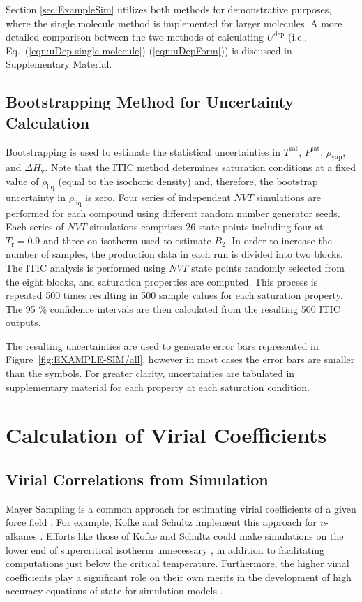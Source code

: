 \documentclass[5p,times]{elsarticle}
\begin{document}
Section \ref{sec:ExampleSim} utilizes both methods for demonstrative purposes, where the single molecule method is implemented for larger molecules. A more detailed comparison between the two methods of calculating $U^{\mathrm{dep}}$ (i.e., Eq.~(\ref{eqn:uDep single molecule})-(\ref{eqn:uDepForm})) is discussed in Supplementary Material.



\subsection{Bootstrapping Method for Uncertainty Calculation}\label{sec:bootstrapping}
Bootstrapping is used to estimate the statistical uncertainties \cite{Efron1981} in $T^\mathrm{sat}$, $P^\mathrm{sat}$, $\rho_\mathrm{vap}$, and $\Delta H_\mathrm{v}$. Note that the ITIC method determines saturation conditions at a fixed value of $\rho_{\mathrm{liq}}$ (equal to the isochoric density) and, therefore, the bootstrap uncertainty in $\rho_{\mathrm{liq}}$ is zero. Four series of independent $NVT$ simulations are performed for each compound using different random number generator seeds. Each series of $NVT$ simulations comprises 26 state points including four at $T_\mathrm{r}=0.9$ and three on isotherm used to estimate $B_2$. In order to increase the number of samples, the production data in each run is divided into two blocks. The ITIC analysis is performed using $NVT$ state points randomly selected from the eight blocks, and saturation properties are computed. This process is repeated 500 times resulting in 500 sample values for each saturation property. The 95 \% confidence intervals are then calculated from the resulting 500 ITIC outputs. 

The resulting uncertainties are used to generate error bars represented in Figure~\ref{fig:EXAMPLE-SIM/all}, however in most cases the error bars are smaller than the symbols. For greater clarity, uncertainties are tabulated in supplementary material for each property at each saturation condition.

\section{Calculation of Virial Coefficients} \label{sec:VirialCalc}
\subsection{Virial Correlations from Simulation} \label{sec:VirialCorrelations}
Mayer Sampling is a common approach for estimating virial coefficients of a given force field \cite{singh2004mayer}. For example, Kofke and Schultz implement this approach for \textit{n}-alkanes \cite{Schultz2010a}. Efforts like those of Kofke and Schultz could make simulations on the lower end of supercritical isotherm unnecessary \cite{barlow2015communication}, in addition to facilitating computations just below the critical temperature.  Furthermore, the higher virial coefficients play a significant role on their own merits in the development of high accuracy equations of state for simulation models \cite{thol2016equation}.
\end{document}
